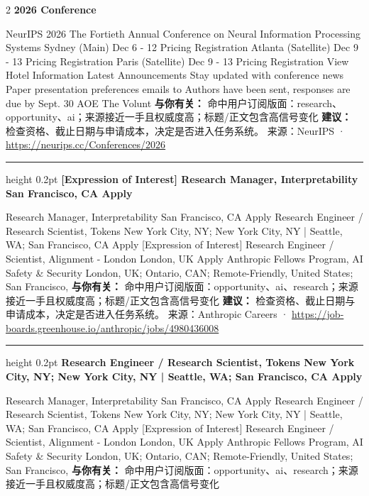 \documentclass[10.5pt]{ctexart}
\begin{document}
\begin{multicols}{2}
{\large\bfseries 2026 Conference}\par
NeurIPS 2026 The Fortieth Annual Conference on Neural Information Processing Systems Sydney (Main) Dec 6 - 12 Pricing Registration Atlanta (Satellite) Dec 9 - 13 Pricing Registration Paris (Satellite) Dec 9 - 13 Pricing Registration View Hotel Information Latest Announcements Stay updated with conference news Paper presentation preferences emails to Authors have been sent, responses are due by Sept. 30 AOE The Volunt
\textbf{与你有关：} 命中用户订阅版面：research、opportunity、ai；来源接近一手且权威度高；标题/正文包含高信号变化
\textbf{建议：} 检查资格、截止日期与申请成本，决定是否进入任务系统。
{\footnotesize\color{ormuted} 来源：NeurIPS · \url{https://neurips.cc/Conferences/2026}}
\vspace{2mm}
\hrule height 0.2pt
\vspace{2mm}
{\large\bfseries [Expression of Interest] Research Manager, Interpretability San Francisco, CA Apply}\par
[Expression of Interest] Research Manager, Interpretability San Francisco, CA Apply Research Engineer / Research Scientist, Tokens New York City, NY; New York City, NY | Seattle, WA; San Francisco, CA Apply [Expression of Interest] Research Engineer / Scientist, Alignment - London London, UK Apply Anthropic Fellows Program, AI Safety \& Security London, UK; Ontario, CAN; Remote-Friendly, United States; San Francisco, 
\textbf{与你有关：} 命中用户订阅版面：opportunity、ai、research；来源接近一手且权威度高；标题/正文包含高信号变化
\textbf{建议：} 检查资格、截止日期与申请成本，决定是否进入任务系统。
{\footnotesize\color{ormuted} 来源：Anthropic Careers · \url{https://job-boards.greenhouse.io/anthropic/jobs/4980436008}}
\vspace{2mm}
\hrule height 0.2pt
\vspace{2mm}
{\large\bfseries Research Engineer / Research Scientist, Tokens New York City, NY; New York City, NY | Seattle, WA; San Francisco, CA Apply}\par
[Expression of Interest] Research Manager, Interpretability San Francisco, CA Apply Research Engineer / Research Scientist, Tokens New York City, NY; New York City, NY | Seattle, WA; San Francisco, CA Apply [Expression of Interest] Research Engineer / Scientist, Alignment - London London, UK Apply Anthropic Fellows Program, AI Safety \& Security London, UK; Ontario, CAN; Remote-Friendly, United States; San Francisco, 
\textbf{与你有关：} 命中用户订阅版面：opportunity、ai、research；来源接近一手且权威度高；标题/正文包含高信号变化

\end{multicols}
\end{document}

